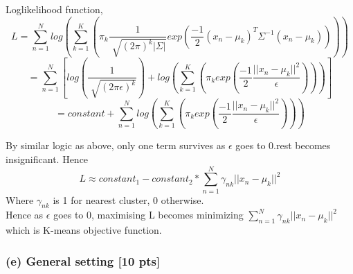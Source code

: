 \documentclass[twoside,10pt]{article}
\begin{document}
Loglikelihood function,
$$ L = \sum_{n=1}^{N}log (\sum_{k=1}^{K}(\pi_k \frac{1}{\sqrt[]{(2\pi)^k|\Sigma|}} exp(\frac{-1}{2}(x_n - \mu_k)^T \Sigma ^ {-1} (x_n - \mu_k))))  $$
$$= \sum_{n=1}^{N}{[log(\frac{1}{\sqrt[]{(2\pi\epsilon)^k}}) + log (\sum_{k=1}^{K}(\pi_k exp(\frac{-1}{2}\frac{||x_n - \mu_k||^2}{\epsilon} ))) ]} $$
$$= constant+\sum_{n=1}^{N}{ log (\sum_{k=1}^{K}(\pi_k exp(\frac{-1}{2}\frac{||x_n - \mu_k||^2}{\epsilon} ))) } $$

By similar logic as above, only one term survives as $\epsilon$ goes to 0.rest becomes insignificant. 
Hence 
$$ L \approx constant_1 - constant_2 * \sum_{n=1}^{N}{  \gamma_{nk} ||x_n-\mu_k||^2}
$$
Where $\gamma_{nk}$ is 1 for nearest cluster, 0 otherwise.\\
Hence as $\epsilon$ goes to 0, maximising L becomes minimizing $ \sum_{n=1}^{N}{  \gamma_{nk} ||x_n-\mu_k||^2}$ which is K-means objective function.
\newpage


\subsubsection*{(e) General setting [10 pts]}
\end{document}
